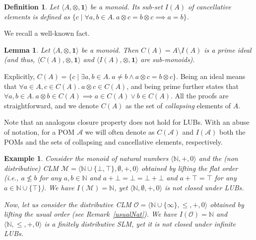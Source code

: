 \documentclass[a4paper]{elsarticle}
\newtheorem{definition}{Definition}
\newtheorem{example}{Example}
\newtheorem{lemma}{Lemma}
\newcommand{\monop}{\otimes}
\newcommand{\1}{\mathbf{1}}
\begin{document}
\begin{definition}
	Let $\langle A, \monop, \1 \rangle$ be a monoid. Its sub-set $I(A)$ 
	of \emph{cancellative} elements is defined as 
	$\{ c \mid \forall a, b \in A.\ a \otimes c = b \otimes c \implies a = b \}$.
\end{definition}

We  recall a well-known fact.

\begin{lemma}
	\label{ideal}
	Let $\langle A, \monop, \1 \rangle$ be a monoid.
	Then $C(A) = A\setminus I(A)$ is
	a prime ideal (and thus, $\langle C(A), \monop, \1 \rangle$
	and $\langle I(A), \monop, \1 \rangle$ are sub-monoids).
\end{lemma}

Explicitly, $C(A) = \{ c \mid \exists a, b \in A.\ a \neq b \wedge a \otimes c = b \otimes c\}$.
%
Being an ideal means that $\forall a \in A, c \in C( A).\ a \otimes c \in C(A)$,
and being prime further states that 
$\forall a, b \in A.\ a\otimes b \in C( A) \implies a \in C(A) \vee b \in C(A)$.
%
All the proofs are straightforward, and we denote $C(A)$ as the set of \emph{collapsing} 
elements of $A$. 

Note that an analogous closure property does not hold for LUBs. With an abuse of notation,
for a POM $\mathcal{A}$ we will often denote as $C(\mathcal{A})$ and $I(\mathcal{A})$ both the POMs 
and the sets of collapsing and cancellative elements, respectively.

\begin{example}\label{flat}
	Consider
	the monoid of natural numbers $\langle \mathbb N, +, 0 \rangle$ and 
	the (non distributive) CLM $\mathcal{M} = \langle \mathbb{N} \cup \{\bot,\top\}, \emptyset, +, 0\rangle$ 
	obtained by lifting the flat order (i.e., $a \not \leq b$ for any $a, b \in \mathbb N$ and 
	$a + \bot = \bot = \bot + \bot$ and $a + \top = \top$  for any $a \in \mathbb N \cup \{\top\}$).
	We have $I(\mathcal{M}) =  \mathbb{N}$, yet $\langle \mathbb N, \emptyset, +, 0\rangle$ is not closed under LUBs. 
	
	Now, let us consider the distributive CLM
	$\mathcal{O} = \langle \mathbb N \cup \{\infty\}, \leq, +, 0\rangle$ 
	obtained by lifting the usual order (see Remark~\ref{usualNat}).
	We have $I(\mathcal{O}) = \mathbb{N}$ and $\langle \mathbb N, \leq, +, 0\rangle$ is a finitely distributive SLM, yet
	it is not closed under infinite LUBs.
\end{example}
\end{document}
